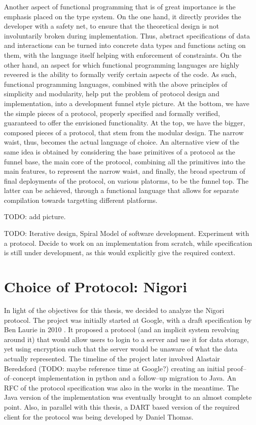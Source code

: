 Another aspect of functional programming that is of great importance is the emphasis placed on the type system.
On the one hand, it directly provides the developer with a safety net, to ensure that the theoretical design is not involuntarily broken during implementation.
Thus, abstract specifications of data and interactions can be turned into concrete data types and functions acting on them, with the language itself helping with enforcement of constraints.
On the other hand, an aspect for which functional programming languages are highly reveered is the ability to formally verify certain aspects of the code.
As such, functional programming languages, combined with the above principles of simplicity and modularity, help put the problem of protocol design and implementation, into a development funnel style picture.
At the bottom, we have the simple pieces of a protocol, properly specified and formally verified, guaranteed to offer the envisioned functionality.
At the top, we have the bigger, composed pieces of a protocol, that stem from the modular design.
The narrow waist, thus, becomes the actual language of choice.
An alternative view of the same idea is obtained by considering the base primitives of a protocol as the funnel base, the main core of the protocol, combining all the primitives into the main features, to represent the narrow waist, and finally, the broad spectrum of final deployments of the protocol, on various platorms, to be the funnel top.
The latter can be achieved, through a functional language that allows for separate compilation towards targetting different platforms.

TODO: add picture.

TODO: Iterative design, Spiral Model of software development. Experiment with a \wip protocol. Decide to work on an implementation from scratch, while specification is still under development, as this would explicitly give the required context.

\section{Choice of Protocol: Nigori}
In light of the objectives for this thesis, we decided to analyze the Nigori protocol.
The project was initially started at Google, with a draft specification by Ben Laurie in 2010 \cite{NigoriDraft}.
It proposed a protocol (and an implicit system revolving around it) that would allow users to login to a server and use it for data storage, yet using encryption such that the server would be unaware of what the data actually represented.
The timeline of the project later involved Alastair Beredsford (TODO: maybe reference time at Google?) creating an initial proof--of--concept implementation in python and a follow--up migration to Java.
An RFC \cite{NigoriRFC} of the protocol specification was also in the works in the meantime.
The Java version of the implementation was eventually brought to an almost complete point.
Also, in parallel with this thesis, a DART \cite{DART} based version of the required client for the protocol was being developed by Daniel Thomas.

